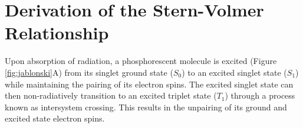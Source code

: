 
\chapter{Derivation of the Stern-Volmer Relationship}

Upon absorption of radiation, a phosphorescent molecule is excited (Figure \ref{fig:jablonski}A) from its singlet ground state ($S_0$) to an excited singlet state ($S_1$) while maintaining the pairing of its electron spins. The excited singlet state can then non-radiatively transition to an excited triplet state ($T_1$) through a process known as intersystem crossing. This results in the unpairing of its ground and excited state electron spins.

